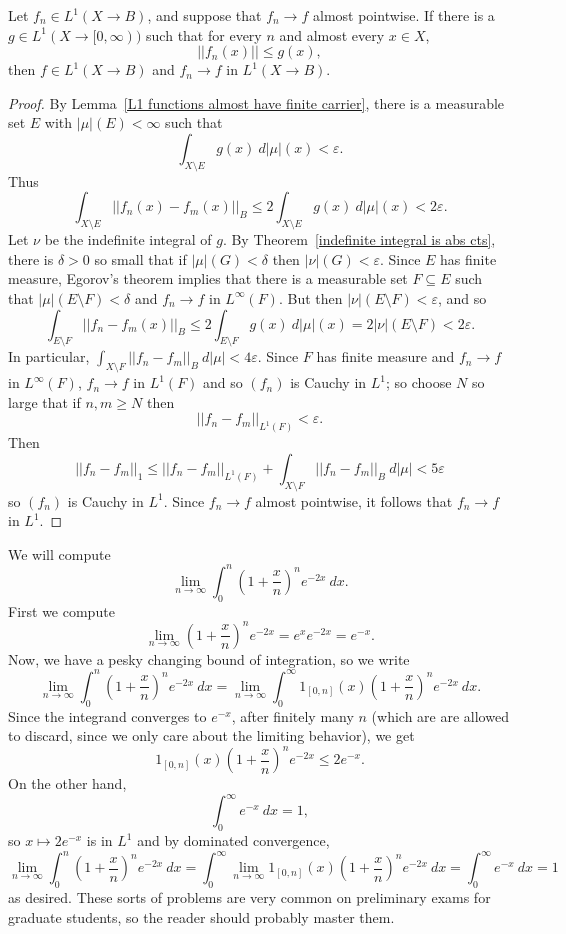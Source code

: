 \begin{theorem}
Let $f_{n} \in L^{1}(X \to B)$, and suppose that $f_{n} \to f$ almost pointwise. If there is a $g \in L^{1}(X \to [0, \infty))$ such that for every $n$ and almost every $x \in X$,
\[||f_{n}(x)|| \leq g(x),\]
then $f \in L^{1}(X \to B)$ and $f_{n} \to f$ in $L^{1}(X \to B)$.
\end{theorem}
\begin{proof}
By Lemma~\ref{L1 functions almost have finite carrier}, there is a measurable set $E$ with $|\mu|(E) < \infty$ such that
\[\int_{X \setminus E} g(x) ~d|\mu|(x) < \varepsilon.\]
Thus
\[\int_{X \setminus E} ||f_{n}(x) - f_{m}(x)||_{B} \leq 2\int_{X \setminus E} g(x) ~d|\mu|(x) < 2\varepsilon.\]
Let $\nu$ be the indefinite integral of $g$.
By Theorem~\ref{indefinite integral is abs cts}, there is $\delta > 0$ so small that if $|\mu|(G) < \delta$ then $|\nu|(G) < \varepsilon$.
Since $E$ has finite measure, Egorov's theorem implies that there is a measurable set $F \subseteq E$ such that $|\mu|(E \setminus F) < \delta$ and $f_{n} \to f$ in $L^{\infty}(F)$.
But then $|\nu|(E \setminus F) < \varepsilon$, and so
\[\int_{E \setminus F} ||f_{n} - f_{m}(x)||_{B} \leq 2\int_{E \setminus F} g(x) ~d|\mu|(x) = 2|\nu|(E \setminus F) < 2\varepsilon.\]
In particular, $\int_{X \setminus F} ||f_{n} - f_{m}||_{B} ~d|\mu| < 4\varepsilon$.
Since $F$ has finite measure and $f_{n} \to f$ in $L^{\infty}(F)$, $f_{n} \to f$ in $L^{1}(F)$ and so $(f_{n})$ is Cauchy in $L^{1}$; so choose $N$ so large that if $n,m \geq N$ then
\[||f_{n} - f_{m}||_{L^{1}(F)} < \varepsilon.\]
Then
\[||f_{n} - f_{m}||_{1} \leq ||f_{n} - f_{m}||_{L^{1}(F)} + \int_{X \setminus F} ||f_{n} - f_{m}||_{B} ~d|\mu| < 5\varepsilon\]
so $(f_{n})$ is Cauchy in $L^{1}$.
Since $f_{n} \to f$ almost pointwise, it follows that $f_{n} \to f$ in $L^{1}$.
\end{proof}

\begin{example}
We will compute
\[\lim_{n \to \infty} \int_{0}^{n} {\left(1 + \frac{x}{n}\right)}^{n} e^{-2x} ~dx.\]
First we compute
\[\lim_{n \to \infty} {\left(1 + \frac{x}{n}\right)}^{n} e^{-2x} = e^{x} e^{-2x} = e^{-x}.\]
Now, we have a pesky changing bound of integration, so we write
\[\lim_{n \to \infty} \int_{0}^{n} {\left(1 + \frac{x}{n}\right)}^{n} e^{-2x} ~dx = \lim_{n \to \infty} \int_{0}^{\infty} 1_{[0, n]}(x) {\left(1 + \frac{x}{n}\right)}^{n} e^{-2x} ~dx.\]
Since the integrand converges to $e^{-x}$, after finitely many $n$ (which are are allowed to discard, since we only care about the limiting behavior), we get
\[1_{[0, n]}{(x) \left(1 + \frac{x}{n}\right)}^{n} e^{-2x} \leq 2e^{-x}.\]
On the other hand,
\[\int_{0}^{\infty} e^{-x} ~dx = 1,\]
so $x \mapsto 2e^{-x}$ is in $L^{1}$ and by dominated convergence,
\[\lim_{n \to \infty} \int_{0}^{n} {\left(1 + \frac{x}{n}\right)}^{n} e^{-2x} ~dx = \int_{0}^{\infty} \lim_{n \to \infty} 1_{[0, n]}(x) {\left(1 + \frac{x}{n}\right)}^{n} e^{-2x} ~dx = \int_{0}^{\infty} e^{-x} ~dx = 1\]
as desired.
These sorts of problems are very common on preliminary exams for graduate students, so the reader should probably master them.
\end{example}

